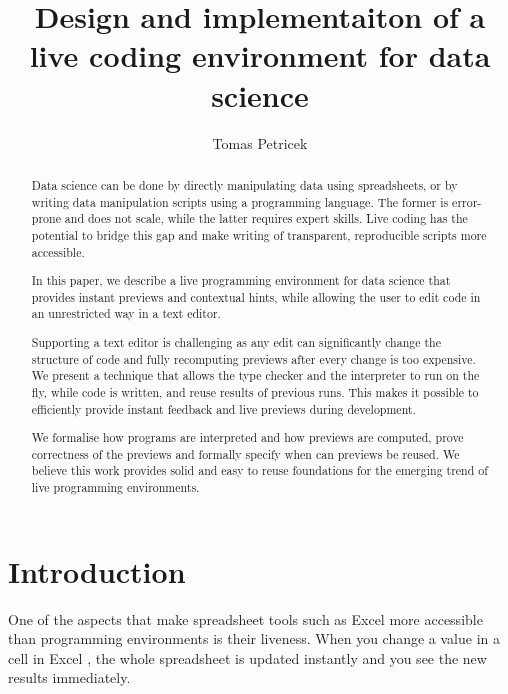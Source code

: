 \documentclass[sigplan,10pt,review,anonymous]{acmart}\settopmatter{printfolios=true,printccs=false,printacmref=false}
\title{Design and implementaiton of a live coding environment for data science}
\author{Tomas Petricek}
\affiliation{
  \institution{The Alan Turing Institute}
  \country{London, United Kingdom}
}
\theoremstyle{plain}
\theoremstyle{definition}
\begin{document}
\begin{abstract}
Data science can be done by directly manipulating data using spreadsheets, or by writing 
data manipulation scripts using a programming language. The former is error-prone and
does not scale, while the latter requires expert skills. Live coding has the potential to 
bridge this gap and make writing of transparent, reproducible scripts more accessible.

In this paper, we describe a live programming environment for data science that provides instant 
previews and contextual hints, while allowing the user to edit code in an unrestricted way in
a text editor. 

Supporting a text editor is challenging as any edit can significantly change the structure of code and
fully recomputing previews after every change is too expensive. We present a technique that allows the type
checker and the interpreter to run on the fly, while code is written, and reuse results of previous 
runs. This makes it possible to efficiently provide instant feedback and live previews during development.

We formalise how programs are interpreted and how previews are computed, prove correctness
of the previews and formally specify when can previews be reused. We believe this work provides
solid and easy to reuse foundations for the emerging trend of live programming environments.
\end{abstract}
\maketitle


\section{Introduction}
\label{sec:intro}

One of the aspects that make spreadsheet tools such as Excel more accessible than programming 
environments is their liveness. When you change a value in a cell in Excel \cite{spreadsheet}, the  
whole spreadsheet is updated instantly and you see the new results immediately.
\end{document}
